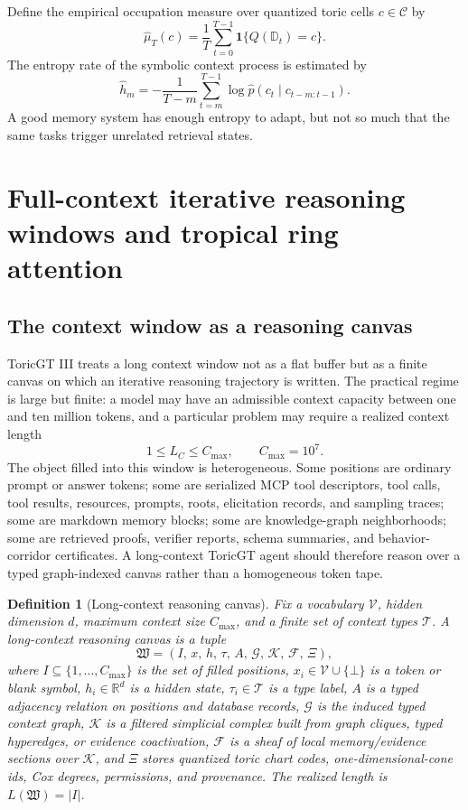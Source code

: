 \documentclass[11pt]{article}
\newtheorem{definition}[theorem]{Definition}
\newcommand{\RR}{\mathbb{R}}
\newcommand{\calK}{\mathcal{K}}
\newcommand{\calF}{\mathcal{F}}
\newcommand{\calG}{\mathcal{G}}
\newcommand{\calV}{\mathcal{V}}
\newcommand{\calT}{\mathcal{T}}
\numberwithin{equation}{section}
\begin{document}
Define the empirical occupation measure over quantized toric cells $c\in\mathcal{C}$ by
\begin{equation}
\hat\mu_T(c)=\frac1T\sum_{t=0}^{T-1}\mathbf{1}\{Q(\mathbb{D}_t)=c\}.
\end{equation}
The entropy rate of the symbolic context process is estimated by
\begin{equation}
\hat h_m=-\frac1{T-m}\sum_{t=m}^{T-1}\log \hat p(c_t\mid c_{t-m:t-1}).
\end{equation}
A good memory system has enough entropy to adapt, but not so much that the same tasks trigger unrelated retrieval states.


\section{Full-context iterative reasoning windows and tropical ring attention}
\subsection{The context window as a reasoning canvas}
ToricGT III treats a long context window not as a flat buffer but as a finite canvas on which an iterative reasoning trajectory is written. The practical regime is large but finite: a model may have an admissible context capacity between one and ten million tokens, and a particular problem may require a realized context length
\begin{equation}
1\le L_C\le C_{\max},\qquad C_{\max}=10^7.
\end{equation}
The object filled into this window is heterogeneous. Some positions are ordinary prompt or answer tokens; some are serialized MCP tool descriptors, tool calls, tool results, resources, prompts, roots, elicitation records, and sampling traces; some are markdown memory blocks; some are knowledge-graph neighborhoods; some are retrieved proofs, verifier reports, schema summaries, and behavior-corridor certificates. A long-context ToricGT agent should therefore reason over a typed graph-indexed canvas rather than a homogeneous token tape.

\begin{definition}[Long-context reasoning canvas]
Fix a vocabulary $\calV$, hidden dimension $d$, maximum context size $C_{\max}$, and a finite set of context types $\calT$. A long-context reasoning canvas is a tuple
\begin{equation}
\mathfrak{W}=(I,\,x,\,h,\,\tau,\,A,\,\calG,\,\calK,\,\calF,\,\Xi),
\end{equation}
where $I\subseteq \{1,\ldots,C_{\max}\}$ is the set of filled positions, $x_i\in\calV\cup\{\bot\}$ is a token or blank symbol, $h_i\in\RR^d$ is a hidden state, $\tau_i\in\calT$ is a type label, $A$ is a typed adjacency relation on positions and database records, $\calG$ is the induced typed context graph, $\calK$ is a filtered simplicial complex built from graph cliques, typed hyperedges, or evidence coactivation, $\calF$ is a sheaf of local memory/evidence sections over $\calK$, and $\Xi$ stores quantized toric chart codes, one-dimensional-cone ids, Cox degrees, permissions, and provenance. The realized length is $L(\mathfrak{W})=|I|$.
\end{definition}
\end{document}
